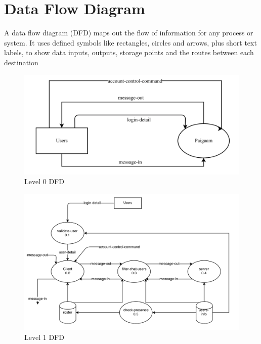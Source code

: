 \section{Data Flow Diagram}
A data flow diagram (DFD) maps out the flow of information for any process or system. It uses defined symbols like rectangles, circles and arrows, plus short text labels, to show data inputs, outputs, storage points and the routes between each destination
\begin{figure}[ht]
\centering
\includegraphics[scale=0.2]{input/images/dfd01.png}
\caption{Level 0 DFD}
\end{figure}
\begin{figure}[ht]
\centering
\includegraphics[scale=0.25]{input/images/dfd02.png}
\caption{Level 1 DFD}
\end{figure}
\newpage

